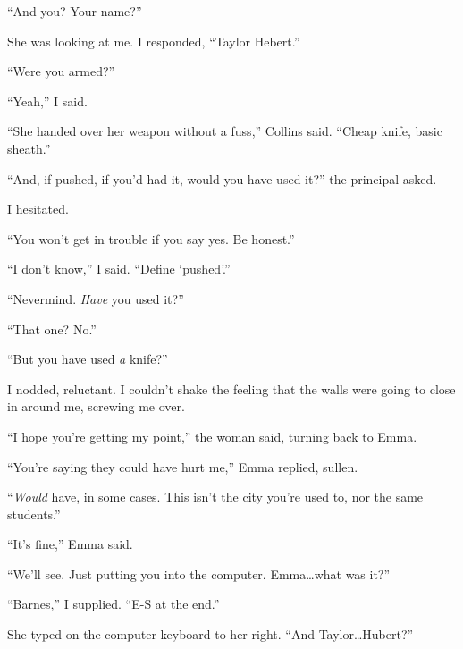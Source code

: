 ``And you?  Your name?''



She was looking at me.  I responded, ``Taylor Hebert.''



``Were you armed?''



``Yeah,'' I said.



``She handed over her weapon without a fuss,'' Collins said.  ``Cheap knife, basic sheath.''



``And, if pushed, if you'd had it, would you have used it?'' the principal asked.



I hesitated.



``You won't get in trouble if you say yes.  Be honest.''



``I don't know,'' I said.  ``Define `pushed'.''



``Nevermind.  \emph{Have} you used it?''



``That one?  No.''



``But you have used \emph{a} knife?''



I nodded, reluctant.  I couldn't shake the feeling that the walls were going to close in around me, screwing me over.



``I hope you're getting my point,'' the woman said, turning back to Emma.



``You're saying they could have hurt me,'' Emma replied, sullen.



``\emph{Would} have, in some cases.  This isn't the city you're used to, nor the same students.''



``It's fine,'' Emma said.



``We'll see.  Just putting you into the computer.  Emma\ldots what was it?''



``Barnes,'' I supplied.  ``E-S at the end.''



She typed on the computer keyboard to her right.  ``And Taylor\ldots Hubert?''



